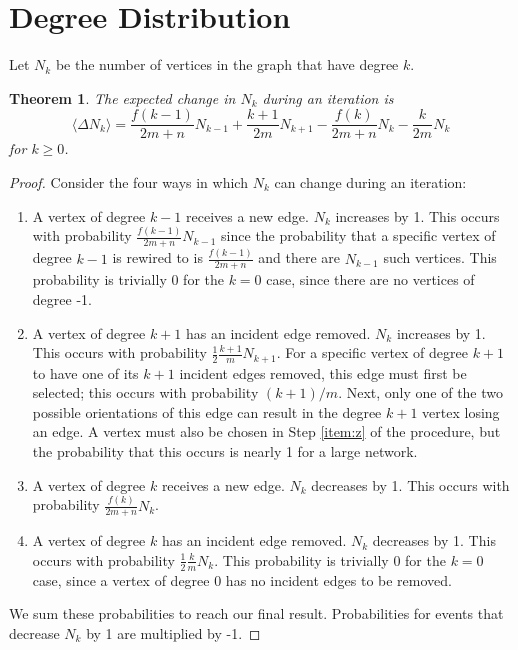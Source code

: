 \documentclass[a4paper,10pt]{article}
\newtheorem{theorem}{Theorem}
\begin{document}
\section{Degree Distribution}
Let $N_k$ be the number of vertices in the graph that have degree $k$.
\begin{theorem}
\label{thm:exp-change}
The expected change in $N_k$ during an iteration is
\begin{equation*}
\label{eqn:N_k}
 \langle \Delta N_k \rangle = \frac{f(k - 1)}{2m + n} N_{k-1} + \frac{k + 1}{2m} N_{k + 1} - \frac{f(k)}{2m + n} N_{k} - \frac{k}{2m} N_{k}
\end{equation*}
for $k \geq 0$.
\end{theorem}
\begin{proof}
Consider the four ways in which $N_k$ can change during an iteration:
 \begin{enumerate}
 \item A vertex of degree $k - 1$ receives a new edge. $N_k$ increases by 1. This occurs with probability $\frac{f(k - 1)}{2m + n} N_{k-1}$ since the probability that a specific vertex of degree $k - 1$ is rewired to is $\frac{f(k - 1)}{2m + n}$ and there are $N_{k - 1}$ such vertices. This probability is trivially 0 for the $k = 0$ case, since there are no vertices of degree -1.
 
 \item A vertex of degree $k + 1$ has an incident edge removed. $N_k$ increases by 1. This occurs with probability $\frac{1}{2} \frac{k + 1}{m} N_{k + 1}$. For a specific vertex of degree $k + 1$ to have one of its $k + 1$ incident edges removed, this edge must first be selected; this occurs with probability $(k + 1)/ m$. Next, only one of the two possible orientations of this edge can result in the degree $k + 1$ vertex losing an edge. A vertex must also be chosen in Step \ref{item:z} of the procedure, but the probability that this occurs is nearly 1 for a large network.
 
 \item A vertex of degree $k$ receives a new edge. $N_k$ decreases by 1. This occurs with probability $\frac{f(k)}{2m + n} N_k$.
 
 \item A vertex of degree $k$ has an incident edge removed. $N_k$ decreases by 1. This occurs with probability $\frac{1}{2} \frac{k}{m} N_{k}.$ This probability is trivially 0 for the $k = 0$ case, since a vertex of degree 0 has no incident edges to be removed.
\end{enumerate}
We sum these probabilities to reach our final result. Probabilities for events that decrease $N_k$ by 1 are multiplied by -1.
\end{proof}
\end{document}
